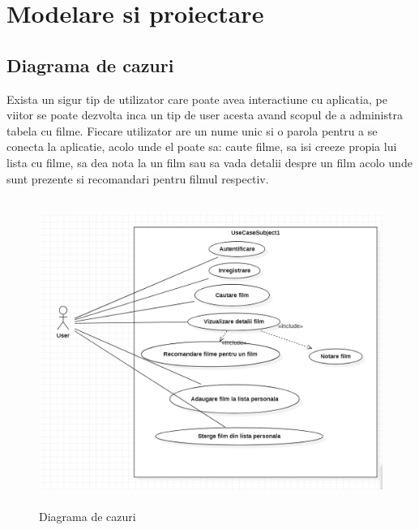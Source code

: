 \chapter{Modelare si proiectare}

\section{Diagrama de cazuri}
\label{sec:ch3sec1}
 \par Exista un sigur tip de utilizator care poate avea interactiune cu aplicatia, pe viitor se poate dezvolta inca un tip de user acesta avand scopul de a administra tabela cu filme. Fiecare utilizator are un nume unic si o parola pentru a se conecta la aplicatie, acolo unde el poate sa: caute filme, sa isi creeze propia lui lista cu filme, sa dea nota la un film sau sa vada detalii despre un film acolo unde sunt prezente si recomandari pentru filmul respectiv.
		\begin{figure}[htbp]
			\centerline{\includegraphics[width=13cm, height=10cm]{figures/use case.png}}
			\caption{Diagrama de cazuri}
			\label{fig}
		\end{figure}



